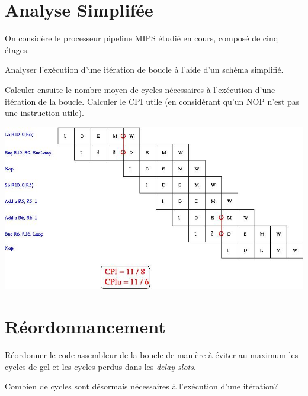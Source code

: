 \begin{correction}
\end{correction}

%
%

\section{Analyse Simplif\'ee}

On consid\`ere le processeur pipeline MIPS \'etudi\'e en cours, compos\'e
de cinq \'etages.

Analyser l'ex\'ecution d'une it\'eration de boucle \`a l'aide d'un
sch\'ema simplifi\'e.

Calculer ensuite le nombre moyen de cycles n\'ecessaires \`a
l'ex\'ecution d'une it\'eration de la boucle. Calculer le CPI utile
(en consid\'erant qu'un NOP n'est pas une instruction utile).

\begin{correction}

  \begin{center}
    \includegraphics[scale=0.7]{figures/correction-analyse-simplifiee.jpg}
  \end{center}

\end{correction}

%
%

\section{R\'eordonnancement}

R\'eordonner le code assembleur de la boucle de mani\`ere \`a \'eviter
au maximum les cycles de gel et les cycles perdus dans les \textit{delay slots}.

Combien de cycles sont d\'esormais n\'ecessaires \`a l'ex\'ecution d'une
it\'eration?

